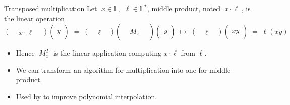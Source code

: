 \documentclass[10pt]{beamer}
\newcommand{\cat}[1]{\mathscr{#1}}
\renewcommand{\L}{\cat{L}}
\renewcommand{\L}{\mathbb{L}}
\begin{document}
\begin{frame}
  \begin{block}{Transposed multiplication}
    Let $\;x\in\L$, $\;\ell\in\L^\ast$, middle product, noted
    $\;x\cdot\ell\;$, is the linear operation
    \begin{equation*}
      \begin{pmatrix}&x\cdot\ell&\end{pmatrix}
      \begin{pmatrix}\\y\\{}\end{pmatrix} \;=\;
      \begin{pmatrix}&\ell&\end{pmatrix}
      \begin{pmatrix}\\&M_x&\\&\end{pmatrix} 
      \begin{pmatrix}\\y\\{}\end{pmatrix} \;\mapsto\;
      \begin{pmatrix}&\ell&\end{pmatrix}
      \begin{pmatrix}\\xy\\{}\end{pmatrix} \;=\;
      \ell(xy)
    \end{equation*}
    \vspace{-2mm}
    \begin{itemize}
    \item Hence $\;M_x^T\;$ is the linear application computing
      $x\cdot\ell$ from $\ell$.
    \item We can transform an algorithm for multiplication into one
      for middle product.
    \item Used by \cite{BLS03} to improve polynomial interpolation.
    \end{itemize}
  \end{block}
\end{frame}
\end{document}
